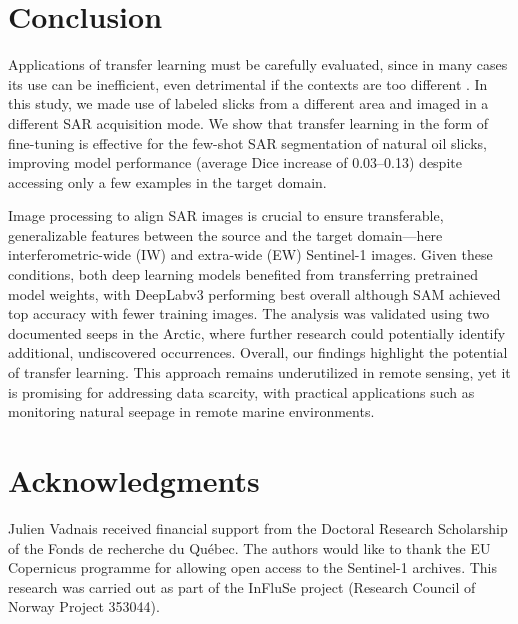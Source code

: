 \documentclass[lettersize,journal]{IEEEtran}
\begin{document}
\section{Conclusion}
Applications of transfer learning must be carefully evaluated, since in many cases its use can be inefficient, even detrimental if the contexts are too different \cite{mensinkFactorsInfluenceTransfer2022}.
In this study, we made use of labeled slicks from a different area and imaged in a different SAR acquisition mode. 
We show that transfer learning in the form of fine-tuning is effective for the few-shot SAR segmentation of natural oil slicks, improving model performance (average Dice increase of 0.03--0.13)
despite accessing only a few examples in the target domain.

Image processing to align SAR images is crucial to ensure transferable, generalizable features between the source and the target domain—here interferometric-wide (IW) and extra-wide (EW) Sentinel-1 images.
Given these conditions, both deep learning models benefited from transferring pretrained model weights, with DeepLabv3 performing best overall although SAM achieved top accuracy with fewer training images.
The analysis was validated using two documented seeps in the Arctic, where further research could potentially identify additional, undiscovered occurrences. 
Overall, our findings highlight the potential of transfer learning. This approach remains underutilized in remote sensing, yet it is promising for addressing data scarcity, 
with practical applications such as monitoring natural seepage in remote marine environments. 

\section*{Acknowledgments}
Julien Vadnais received financial support from the Doctoral Research Scholarship of the Fonds de recherche du Québec. 
The authors would like to thank the EU Copernicus programme for allowing open access to the Sentinel-1 archives.
This research was carried out as part of the InFluSe project (Research Council of Norway Project 353044).


\end{document}
